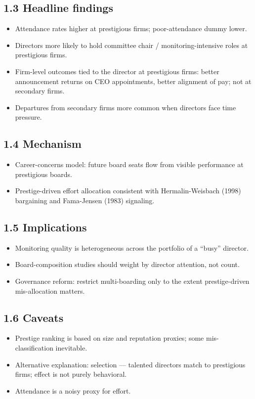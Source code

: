 \documentclass[11pt]{article}
\begin{document}
\subsection*{1.3 Headline findings}
\begin{itemize}
\item Attendance rates higher at prestigious firms; poor-attendance dummy lower.
\item Directors more likely to hold committee chair / monitoring-intensive roles at prestigious firms.
\item Firm-level outcomes tied to the director at prestigious firms: better announcement returns on CEO appointments, better alignment of pay; not at secondary firms.
\item Departures from secondary firms more common when directors face time pressure.
\end{itemize}

\subsection*{1.4 Mechanism}
\begin{itemize}
\item Career-concerns model: future board seats flow from visible performance at prestigious boards.
\item Prestige-driven effort allocation consistent with Hermalin-Weisbach (1998) bargaining and Fama-Jensen (1983) signaling.
\end{itemize}

\subsection*{1.5 Implications}
\begin{itemize}
\item Monitoring quality is heterogeneous across the portfolio of a ``busy'' director.
\item Board-composition studies should weight by director attention, not count.
\item Governance reform: restrict multi-boarding only to the extent prestige-driven mis-allocation matters.
\end{itemize}

\subsection*{1.6 Caveats}
\begin{alertbox}
\begin{itemize}
\item Prestige ranking is based on size and reputation proxies; some mis-classification inevitable.
\item Alternative explanation: selection --- talented directors match to prestigious firms; effect is not purely behavioral.
\item Attendance is a noisy proxy for effort.
\end{itemize}
\end{alertbox}
\end{document}
